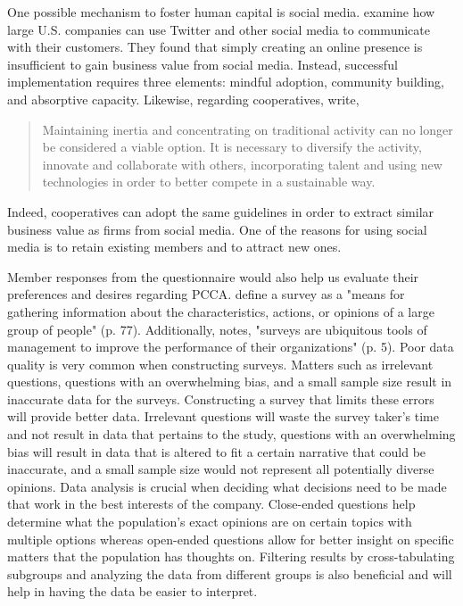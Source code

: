 \documentclass[a4paper]{article}
\begin{document}
One possible mechanism to foster human capital is social media. \citet{culnanHowLargeCompanies2010} examine how large U.S. companies can use Twitter and other social media to communicate with their customers. They found that simply creating an online presence is insufficient to gain business value from social media. Instead, successful implementation requires three elements: mindful adoption, community building, and absorptive capacity. Likewise, regarding cooperatives, \citet{ciruela-lorenzoDigitalizationAgriCooperativesSmart2020} write, 
\begin{quote}
	Maintaining inertia and concentrating on traditional activity can no longer be considered a viable option. It is necessary to diversify the activity, innovate and collaborate with others, incorporating talent and using new technologies in order to better compete in a sustainable way.
\end{quote} Indeed, cooperatives can adopt the same guidelines in order to extract similar business value as firms from social media. One of the reasons for using social media is to retain existing members and to attract new ones. 

Member responses from the questionnaire would also help us evaluate their preferences and desires regarding PCCA. \citet{pinsonneaultSurveyResearchMethodology1993} define a survey as a "means for gathering information about the characteristics, actions, or opinions of a large group of people" (p. 77). Additionally, \citet{grovesSurveyMethodology2009} notes, "surveys are ubiquitous tools of management to improve the performance of their organizations" (p. 5). Poor data quality is very common when constructing surveys. Matters such as irrelevant questions, questions with an overwhelming bias, and a small sample size result in inaccurate data for the surveys. Constructing a survey that limits these errors will provide better data. Irrelevant questions will waste the survey taker's time and not result in data that pertains to the study, questions with an overwhelming bias will result in data that is altered to fit a certain narrative that could be inaccurate, and a small sample size would not represent all potentially diverse opinions. Data analysis is crucial when deciding what decisions need to be made that work in the best interests of the company. Close-ended questions help determine what the population's exact opinions are on certain topics with multiple options whereas open-ended questions allow for better insight on specific matters that the population has thoughts on. Filtering results by cross-tabulating subgroups and analyzing the data from different groups is also beneficial and will help in having the data be easier to interpret. 
\end{document}
